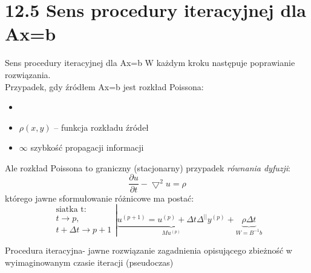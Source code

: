 \section{12.5 Sens procedury iteracyjnej dla Ax=b}

\begin{frame}{Sens procedury iteracyjnej dla Ax=b}
  W każdym kroku następuje poprawianie rozwiązania.\\
  Przypadek, gdy źródłem Ax=b jest rozkład Poissona:
  \begin{itemize}
    \item {}
    \item $\rho(x,y)$ -- funkcja rozkładu źródeł
    \item $\infty$ szybkość propagacji informacji
  \end{itemize}
\end{frame}

\begin{frame}{}
  Ale rozkład Poissona to graniczny (stacjonarny) przypadek \emph{równania dyfuzji}:
  $$\boxed{\frac{\partial u}{\partial t} - \bigtriangledown^2u=\rho}$$
  którego jawne sformułowanie różnicowe ma postać:
  $$
  \left.
  \begin{array}{lr}
    \text{siatka t}:\\
    t\rightarrow p,\\
    t+\Delta t\rightarrow p+1
  \end{array}\right|
  \underbrace{u^{(p+1)}=u^{(p)}+\Delta t\Delta^{||}y^{(p)}}_{Mu^{(p)}}+\underbrace{\rho\Delta t}_{W=B^{-1}b}
  $$
  

  Procedura iteracyjna- jawne rozwiązanie zagadnienia opisującego zbieżność w wyimaginowanym czasie iteracji (pseudoczas)
\end{frame}

